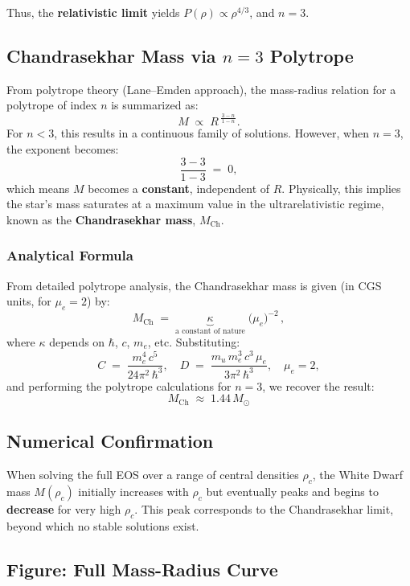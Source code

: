 \documentclass[12pt]{article}
\begin{document}
Thus, the \textbf{relativistic limit} yields $P(\rho)\propto \rho^{4/3}$, and $n=3$.  

\subsection{Chandrasekhar Mass via \(n=3\) Polytrope}

From polytrope theory (Lane–Emden approach), the mass-radius relation for a polytrope of index \(n\) is summarized as:
\[
M \;\propto\; R^{\,\frac{3 - n}{\,1 - n\,}}.
\]
For \(n < 3\), this results in a continuous family of solutions. However, when \(n=3\), the exponent becomes:
\[
\frac{3 - 3}{1 - 3} \;=\; 0,
\]
which means \(M\) becomes a \textbf{constant}, independent of \(R\). Physically, this implies the star’s mass saturates at a maximum value in the ultrarelativistic regime, known as the \textbf{Chandrasekhar mass}, \(M_{\mathrm{Ch}}\).

\subsubsection{Analytical Formula}

From detailed polytrope analysis, the Chandrasekhar mass is given (in CGS units, for \(\mu_e=2\)) by:
\[
M_{\mathrm{Ch}}
\;=\;
\underbrace{\kappa}_{\text{a constant of nature}}
\;\bigl(\mu_e\bigr)^{-2}\,,
\]
where \(\kappa\) depends on \(\hbar\), \(c\), \(m_e\), etc. Substituting:
\[
C \;=\; \frac{m_e^{4}\,c^{5}}{24\pi^{2}\,\hbar^{3}},
\quad
D \;=\; \frac{m_u\,m_e^{3}\,c^{3}\,\mu_e}{3\pi^2\,\hbar^3},
\quad
\mu_e=2,
\]
and performing the polytrope calculations for \(n=3\), we recover the result:
\[
M_{\mathrm{Ch}}
\;\approx\;
1.44\,M_{\odot}
\]

\subsection{Numerical Confirmation}

When solving the full EOS over a range of central densities \(\rho_c\), the White Dwarf mass \(M(\rho_c)\) initially increases with \(\rho_c\) but eventually peaks and begins to \textbf{decrease} for very high \(\rho_c\). This peak corresponds to the Chandrasekhar limit, beyond which no stable solutions exist.

\subsection{Figure: Full Mass-Radius Curve}
\end{document}
